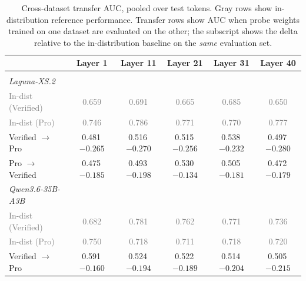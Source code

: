 \begin{table}[t]
\centering
\caption{Cross-dataset transfer AUC, pooled over test tokens. Gray rows show in-distribution reference performance. Transfer rows show AUC when probe weights trained on one dataset are evaluated on the other; the subscript shows the delta relative to the in-distribution baseline on the \emph{same} evaluation set.}
\label{tab:transfer}
\begin{tabular}{lccccc}
\toprule
 & Layer 1 & Layer 11 & Layer 21 & Layer 31 & Layer 40 \\
\midrule
\multicolumn{6}{l}{\textit{\Syntactic{}}} \\
\quad{}\textit{Laguna-XS.2} \\
\qquad{}\textcolor{gray}{\small In-dist (Verified)} & \textcolor{gray}{\small 0.659} & \textcolor{gray}{\small 0.691} & \textcolor{gray}{\small 0.665} & \textcolor{gray}{\small 0.685} & \textcolor{gray}{\small 0.650} \\
\qquad{}\textcolor{gray}{\small In-dist (Pro)} & \textcolor{gray}{\small 0.746} & \textcolor{gray}{\small 0.786} & \textcolor{gray}{\small 0.771} & \textcolor{gray}{\small 0.770} & \textcolor{gray}{\small 0.777} \\
\qquad{}Verified $\rightarrow$ Pro & 0.481\,{\scriptsize \textcolor{red!70!black}{$-0.265$}} & 0.516\,{\scriptsize \textcolor{red!70!black}{$-0.270$}} & 0.515\,{\scriptsize \textcolor{red!70!black}{$-0.256$}} & 0.538\,{\scriptsize \textcolor{red!70!black}{$-0.232$}} & 0.497\,{\scriptsize \textcolor{red!70!black}{$-0.280$}}  \\
\qquad{}Pro $\rightarrow$ Verified & 0.475\,{\scriptsize \textcolor{red!70!black}{$-0.185$}} & 0.493\,{\scriptsize \textcolor{red!70!black}{$-0.198$}} & 0.530\,{\scriptsize \textcolor{red!70!black}{$-0.134$}} & 0.505\,{\scriptsize \textcolor{red!70!black}{$-0.181$}} & 0.472\,{\scriptsize \textcolor{red!70!black}{$-0.179$}}  \\
\quad{}\textit{Qwen3.6-35B-A3B} \\
\qquad{}\textcolor{gray}{\small In-dist (Verified)} & \textcolor{gray}{\small 0.682} & \textcolor{gray}{\small 0.781} & \textcolor{gray}{\small 0.762} & \textcolor{gray}{\small 0.771} & \textcolor{gray}{\small 0.736} \\
\qquad{}\textcolor{gray}{\small In-dist (Pro)} & \textcolor{gray}{\small 0.750} & \textcolor{gray}{\small 0.718} & \textcolor{gray}{\small 0.711} & \textcolor{gray}{\small 0.718} & \textcolor{gray}{\small 0.720} \\
\qquad{}Verified $\rightarrow$ Pro & 0.591\,{\scriptsize \textcolor{red!70!black}{$-0.160$}} & 0.524\,{\scriptsize \textcolor{red!70!black}{$-0.194$}} & 0.522\,{\scriptsize \textcolor{red!70!black}{$-0.189$}} & 0.514\,{\scriptsize \textcolor{red!70!black}{$-0.204$}} & 0.505\,{\scriptsize \textcolor{red!70!black}{$-0.215$}}  \\

\end{tabular}
\end{table}
